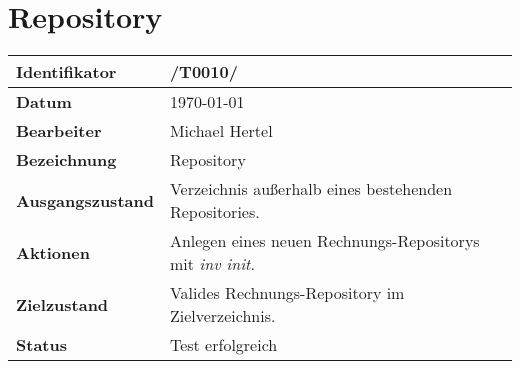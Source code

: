 
\section{Repository}

\renewcommand{\arraystretch}{1.5}

\begin{center}
 \begin{tabular}{|p{}|p{}|}
	\hline
	\textbf{Identifikator}  & /T0010/ \\
	\hline
	\textbf{Datum} & \today \\
	\hline
	\textbf{Bearbeiter} & Michael Hertel \\
	\hline
	\textbf{Bezeichnung} & Repository \\
	\hline
	\textbf{Ausgangszustand} & 
		Verzeichnis außerhalb eines bestehenden Repositories. \\
	\hline
	\textbf{Aktionen} & 
		Anlegen eines neuen Rechnungs-Repositorys mit \textit{inv init}. \\
	\hline
	\textbf{Zielzustand} & 
		Valides Rechnungs-Repository im Zielverzeichnis. \\
	\hline
	\textbf{Status} & Test erfolgreich \\
	\hline
 \end{tabular}
\end{center}
